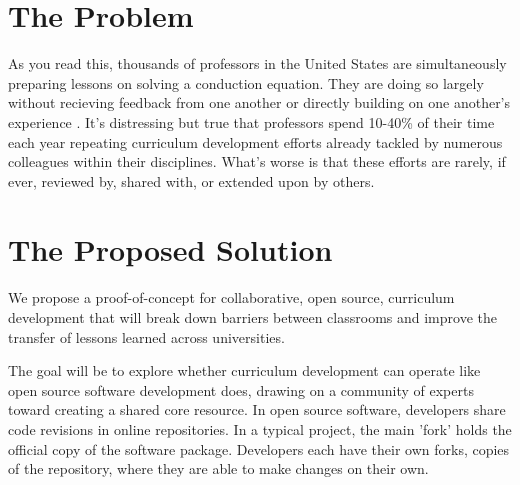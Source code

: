 \documentclass[11pt]{article}
\makeatletter
\newcommand{\authorname}{Kathryn~D.~Huff }
\newcommand{\authoremail}{katyhuff@illinois.edu}
\newcommand{\authorsite}{arfc.npre.illinois.edu}
\makeatother
\begin{document}
          \pagestyle{fancy}
          \lhead{\textcolor{gray}{Investigator: Prof. \authorname\\\authoremail}}
          \rhead{\textcolor{gray}{Advanced Reactors and Fuel Cycles\\Dept. of Nuclear, 
          Plasma, and Radiological Engineering}}
          \renewcommand{\headrulewidth}{0pt}
          \renewcommand{\footrulewidth}{0pt}
          \fancyfoot[C]{\footnotesize \textcolor{gray}{\authorsite}}

          \section{The Problem}
          As you read this, thousands of professors in the United States are 
          simultaneously preparing lessons on solving a conduction equation. They are doing so largely 
          without recieving feedback from one another or directly building on 
          one another's experience \cite{wilson_software_2014}.  It's distressing but 
          true that professors spend 10-40\% of 
          their time each year repeating curriculum development efforts already 
          tackled by numerous colleagues within their disciplines. What's worse 
          is that these efforts are rarely, if ever, reviewed by, shared with, 
          or extended upon by others.

          \section{The Proposed Solution}
          We propose a proof-of-concept for collaborative, open source, 
          curriculum development that will break down barriers between 
          classrooms and improve the transfer of lessons learned across universities.
          
          The goal will be to explore whether curriculum development can 
          operate like open source software development does, drawing on a 
          community of experts toward creating a shared core resource. In open 
          source software, developers share code revisions in online 
          repositories. In a typical project, the main 'fork' holds the 
          official copy of the software package. Developers each have their own 
          forks, copies of the repository, where they are able to make changes 
          on their own. 
\end{document}
